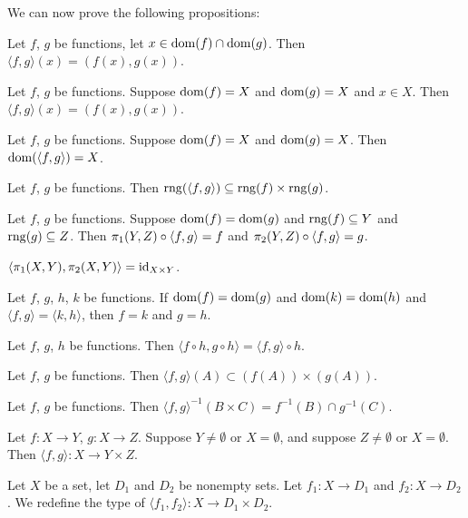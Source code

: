 \documentclass{article}
\begin{document}
We can now prove the following propositions:
\begin{thm}
\item\label{funct3:48} Let $f$, $g$ be functions, let $x\in\operatorname{dom}(f)\cap\operatorname{dom}(g)$.
  Then $\langle f,g\rangle(x)=(f(x),g(x))$.
\item\label{funct3:49} Let $f$, $g$ be functions. Suppose $\operatorname{dom}(f)=X$
  and $\operatorname{dom}(g)=X$ and $x\in X$. Then $\langle f,g\rangle(x)=(f(x),g(x))$.
\item\label{funct3:50} Let $f$, $g$ be functions. Suppose $\operatorname{dom}(f)=X$
  and $\operatorname{dom}(g)=X$. Then $\operatorname{dom}(\langle f,g\rangle)=X$.
\item\label{funct3:51} Let $f$, $g$ be functions.
  Then $\operatorname{rng}(\langle f,g\rangle)\subseteq\operatorname{rng}(f)\times\operatorname{rng}(g)$.
\item\label{funct3:52} Let $f$, $g$ be functions.
  Suppose $\operatorname{dom}(f)=\operatorname{dom}(g)$ and $\operatorname{rng}(f)\subseteq Y$ and $\operatorname{rng}(g)\subseteq Z$.
  Then $\pi_{1}(Y, Z)\circ\langle f,g\rangle=f$ and $\pi_{2}(Y, Z)\circ\langle f,g\rangle=g$.
\item\label{funct3:53}
  $\langle\pi_{1}(X, Y),\pi_{2}(X, Y)\rangle=\operatorname{id}_{X\times Y}$.
\item\label{funct3:54} Let $f$, $g$, $h$, $k$ be functions.
  If $\operatorname{dom}(f)=\operatorname{dom}(g)$ and $\operatorname{dom}(k)=\operatorname{dom}(h)$ and $\langle f,g\rangle=\langle k,h\rangle$,
  then $f=k$ and $g=h$.
\item\label{funct3:55} Let $f$, $g$, $h$ be functions.
  Then $\langle f\circ h,g\circ h\rangle=\langle f,g\rangle\circ h$.
\item\label{funct3:56} Let $f$, $g$ be functions.
  Then $\langle f,g\rangle(A)\subset(f(A))\times(g(A))$.
\item\label{funct3:57} Let $f$, $g$ be functions.
  Then $\langle f,g\rangle^{-1}(B\times C)=f^{-1}(B)\cap g^{-1}(C)$.
\item\label{funct3:58} Let $f\colon X\to Y$, $g\colon X\to Z$.
  Suppose $Y\neq\emptyset$ or $X=\emptyset$, and suppose $Z\neq\emptyset$
  or $X=\emptyset$.
  Then $\langle f,g\rangle\colon X\to Y\times Z$. 
\end{thm}

\begin{definition}
Let $X$ be a set, let $D_{1}$ and $D_{2}$ be nonempty sets.
Let $f_{1}\colon X\to D_{1}$ and $f_{2}\colon X\to D_{2}$.
We redefine the type of $\langle f_{1},f_{2}\rangle\colon X\to D_{1}\times D_{2}$.
\end{definition}
\end{document}
